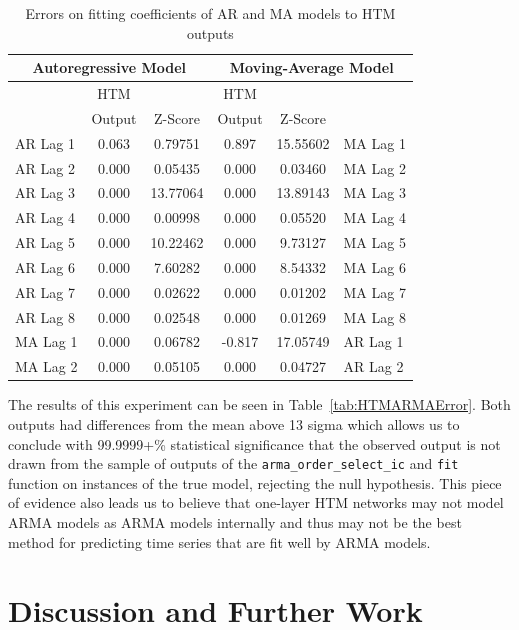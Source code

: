 \documentclass[oneside,12pt,openany]{book}
\begin{document}
	\begin{table}[!ht]
		\centering
		\begin{tabular}{|l|c|c|c|c|l|}
			\hline
			\multicolumn{3}{|c|}{Autoregressive Model} & \multicolumn{3}{c|}{Moving-Average Model} \\ \hline
			\cellcolor{black} & HTM & & HTM &  & \cellcolor{black} \\
			\cellcolor{black} & Output & Z-Score & Output & Z-Score & \cellcolor{black} \\ \hline
			AR Lag 1 & 0.063 & 0.79751 & 0.897 & 15.55602 & MA Lag 1 \\ \hline
			AR Lag 2 & 0.000 & 0.05435 & 0.000 & 0.03460 & MA Lag 2 \\ \hline
			AR Lag 3 & 0.000 & 13.77064 & 0.000 & 13.89143 & MA Lag 3 \\ \hline
			AR Lag 4 & 0.000 & 0.00998 & 0.000 & 0.05520 & MA Lag 4 \\ \hline
			AR Lag 5 & 0.000 & 10.22462 & 0.000 & 9.73127 & MA Lag 5 \\ \hline
			AR Lag 6 & 0.000 & 7.60282 & 0.000 & 8.54332 & MA Lag 6 \\ \hline
			AR Lag 7 & 0.000 & 0.02622 & 0.000 & 0.01202 & MA Lag 7 \\ \hline
			AR Lag 8 & 0.000 & 0.02548 & 0.000 & 0.01269 & MA Lag 8 \\ \hline
			MA Lag 1 & 0.000 & 0.06782 & -0.817 & 17.05749 & AR Lag 1 \\ \hline
			MA Lag 2 & 0.000 & 0.05105 & 0.000 & 0.04727 & AR Lag 2 \\ \hline
		\end{tabular}
		\caption{Errors on fitting coefficients of AR and MA models to HTM outputs}
		\label{tab:HTMARMAError6}
	\end{table}
	
	The results of this experiment can be seen in Table~\ref{tab:HTMARMAError}. Both outputs had differences from the mean above 13 sigma which allows us to conclude with 99.9999+\% statistical significance that the observed output is not drawn from the sample of outputs of the \texttt{arma\_order\_select\_ic} and \texttt{fit} function on instances of the true model, rejecting the null hypothesis. This piece of evidence also leads us to believe that one-layer HTM networks may not model ARMA models as ARMA models internally and thus may not be the best method for predicting time series that are fit well by ARMA models.
	
	
	\chapter{Discussion and Further Work}
    
\end{document}
